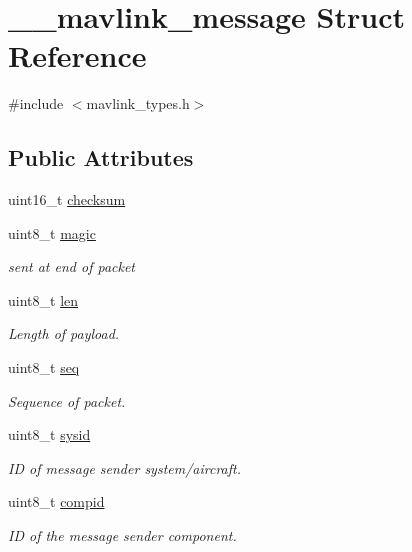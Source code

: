 \hypertarget{struct____mavlink__message}{}\section{\+\_\+\+\_\+mavlink\+\_\+message Struct Reference}
\label{struct____mavlink__message}


{\ttfamily \#include $<$mavlink\+\_\+types.\+h$>$}

\subsection*{Public Attributes}
\begin{DoxyCompactItemize}
\item 
uint16\+\_\+t \mbox{\hyperlink{struct____mavlink__message_a8c200d7751471b5ac54d090ba279a5a6}{checksum}}
\item 
uint8\+\_\+t \mbox{\hyperlink{struct____mavlink__message_a2e6ee9d46821aea33a08231dea000355}{magic}}
\begin{DoxyCompactList}\small\item\em sent at end of packet \end{DoxyCompactList}\item 
uint8\+\_\+t \mbox{\hyperlink{struct____mavlink__message_a6a405c678e4b9fe57e5e621c5bcd4841}{len}}
\begin{DoxyCompactList}\small\item\em Length of payload. \end{DoxyCompactList}\item 
uint8\+\_\+t \mbox{\hyperlink{struct____mavlink__message_aae05bedaab3c62acaccb416478490eff}{seq}}
\begin{DoxyCompactList}\small\item\em Sequence of packet. \end{DoxyCompactList}\item 
uint8\+\_\+t \mbox{\hyperlink{struct____mavlink__message_ad4bfd4108688429b30940a35b44d4dd3}{sysid}}
\begin{DoxyCompactList}\small\item\em ID of message sender system/aircraft. \end{DoxyCompactList}\item 
uint8\+\_\+t \mbox{\hyperlink{struct____mavlink__message_a83ed773c359ffe4a8d0746f82af2b44d}{compid}}
\begin{DoxyCompactList}\small\item\em ID of the message sender component. \end{DoxyCompactList}\item 

\end{DoxyCompactItemize}
